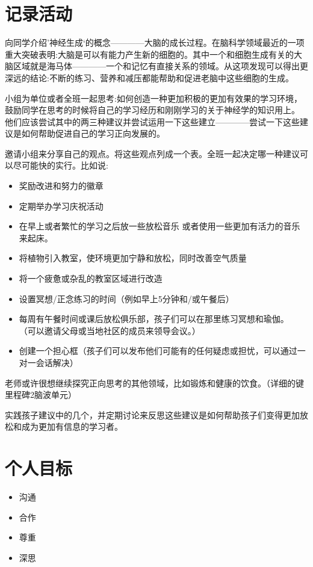 \section{记录活动}
    向同学介绍’神经生成‘的概念————大脑的成长过程。在脑科学领域最近的一项重大突破表明:大脑是可以有能力产生新的细胞的。其中一个和细胞生成有关的大脑区域就是海马体————一个和记忆有直接关系的领域。从这项发现可以得出更深远的结论:不断的练习、营养和减压都能帮助和促进老脑中这些细胞的生成。\par
    小组为单位或者全班一起思考:如何创造一种更加积极的更加有效果的学习环境，鼓励同学在思考的时候将自己的学习经历和刚刚学习的关于神经学的知识用上。 他们应该尝试其中的两三种建议并尝试运用一下这些建立————尝试一下这些建议是如何帮助促进自己的学习正向发展的。\par
    邀请小组来分享自己的观点。将这些观点列成一个表。全班一起决定哪一种建议可以尽可能快的实行。比如说:\par
    \begin{itemize}
      \item 奖励改进和努力的徽章
      \item 定期举办学习庆祝活动
      \item 在早上或者繁忙的学习之后放一些放松音乐 或者使用一些更加有活力的音乐来起床。
      \item 将植物引入教室，使环境更加宁静和放松，同时改善空气质量
      \item 将一个疲惫或杂乱的教室区域进行改造 
      \item 设置冥想/正念练习的时间（例如早上5分钟和/或午餐后）
      \item 每周有午餐时间或课后放松俱乐部，孩子们可以在那里练习冥想和瑜伽。 （可以邀请父母或当地社区的成员来领导会议。）
      \item 创建一个担心框（孩子们可以发布他们可能有的任何疑虑或担忧，可以通过一对一会话解决）
     \end{itemize} 
    老师或许很想继续探究正向思考的其他领域，比如锻炼和健康的饮食。（详细的键里程碑2脑波单元）\par
    实践孩子建议中的几个，并定期讨论来反思这些建议是如何帮助孩子们变得更加放松和成为更加有信息的学习者。\par
\section{个人目标}

      \begin{itemize}
        \item 沟通
        \item 合作
        \item 尊重 
        \item 深思
      \end{itemize}  
